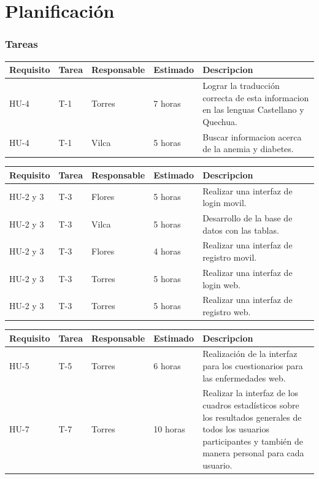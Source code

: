 \chapter{Planificación}

\subsection{Tareas}
\begin{table}[htbp]
	\begin{center}
		\begin{tabular}{| p{1.8cm}| p{1.2cm}| p{2.4cm}|p{2.2cm} |p{7.8cm} |}
			\hline
			\textbf{Requisito} & \textbf{Tarea} & \textbf {Responsable}& \textbf{Estimado} & \textbf{Descripcion}
			\\\hline  
			HU-4&T-1&Torres&7 horas&Lograr la traducción correcta de esta informacion en las lenguas Castellano y Quechua.
			\\ \hline
			HU-4&T-1&Vilca&5 horas&Buscar informacion acerca de la anemia y diabetes.
			\\ \hline
		\end{tabular}
	\end{center}
\end{table}
\begin{table}[htbp]
	\begin{center}
		\begin{tabular}{| p{1.8cm}| p{1.2cm}| p{2.4cm}|p{2.2cm} |p{7.8cm} |}
			\hline
			\textbf{Requisito} & \textbf{Tarea} & \textbf {Responsable}& \textbf{Estimado} & \textbf{Descripcion}
			\\\hline  
			HU-2 y 3&T-3&Flores&5 horas&Realizar una interfaz de login movil.
			\\ \hline
			HU-2 y 3&T-3&Vilca&5 horas&Desarrollo de la base de datos con las tablas.
			\\\hline  
			HU-2 y 3&T-3&Flores&4 horas&Realizar una interfaz de registro movil.
			\\ \hline
			HU-2 y 3&T-3&Torres&5 horas&Realizar una interfaz de login web.
			\\ \hline
			HU-2 y 3&T-3&Torres&5 horas&Realizar una interfaz de registro web.
			\\ \hline
		\end{tabular}
	\end{center}
\end{table}
\begin{table}[htbp]
	\begin{center}
		\begin{tabular}{| p{1.8cm}| p{1.2cm}| p{2.4cm}|p{2.2cm} |p{7.8cm} |}
			\hline
			\textbf{Requisito} & \textbf{Tarea} & \textbf {Responsable}& \textbf{Estimado} & \textbf{Descripcion}
			\\\hline  
			HU-5&T-5&Torres&6 horas&Realización de la interfaz para los cuestionarios para las enfermedades web.
			\\ \hline
			HU-7&T-7&Torres&10 horas&Realizar la interfaz de los cuadros estadísticos sobre los resultados generales de todos los usuarios participantes y también de manera personal para cada usuario.
			\\ \hline
		\end{tabular}
	\end{center}
\end{table}
